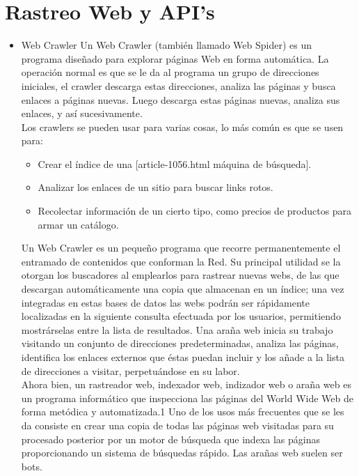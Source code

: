 		\section{Rastreo Web y API's}
		\begin{itemize}
			\item Web Crawler\newline
			Un Web Crawler (también llamado Web Spider) es un programa diseñado para explorar páginas Web en forma automática. La operación normal es que se le da al programa un grupo de direcciones iniciales, el crawler descarga estas direcciones, analiza las páginas y busca enlaces a páginas nuevas. Luego descarga estas páginas nuevas, analiza sus enlaces, y así sucesivamente.\cite{crawling} \\
			Los crawlers se pueden usar para varias cosas, lo más común es que se usen para:
			\begin{itemize}
				\item Crear el índice de una [article-1056.html máquina de búsqueda]. 
				\item Analizar los enlaces de un sitio para buscar links rotos. 
				\item Recolectar información de un cierto tipo, como precios de productos para armar un catálogo. \cite{craw}
			\end{itemize} 
			
			Un Web Crawler es un pequeño programa que recorre permanentemente el entramado de contenidos que conforman la Red. Su principal utilidad se la otorgan los buscadores al emplearlos para rastrear nuevas webs, de las que descargan automáticamente una copia que almacenan en un índice; una vez integradas en estas bases de datos las webs podrán ser rápidamente localizadas en la siguiente consulta efectuada por los usuarios, permitiendo mostrárselas entre la lista de resultados.
			Una araña web inicia su trabajo visitando un conjunto de direcciones predeterminadas, analiza las páginas, identifica los enlaces externos que éstas puedan incluir y los añade a la lista de direcciones a visitar, perpetuándose en su labor.	\cite{web} \\
			
			Ahora bien, un rastreador web, indexador web, indizador web o araña web es un programa informático que inspecciona las páginas del World Wide Web de forma metódica y automatizada.1 Uno de los usos más frecuentes que se les da consiste en crear una copia de todas las páginas web visitadas para su procesado posterior por un motor de búsqueda que indexa las páginas proporcionando un sistema de búsquedas rápido. Las arañas web suelen ser bots. \cite{araña} \\
			

\end{itemize}

